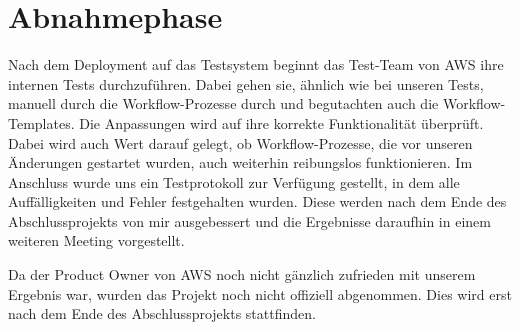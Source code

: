 \section{Abnahmephase}
\label{sec:Abnahmephase}

Nach dem Deployment auf das Testsystem beginnt das Test-Team von AWS ihre internen Tests durchzuführen.
Dabei gehen sie, ähnlich wie bei unseren Tests, manuell durch die Workflow-Prozesse durch und begutachten auch die Workflow-Templates.
Die Anpassungen wird auf ihre korrekte Funktionalität überprüft.
Dabei wird auch Wert darauf gelegt, ob Workflow-Prozesse, die vor unseren Änderungen gestartet wurden, auch weiterhin reibungslos funktionieren.
Im Anschluss wurde uns ein Testprotokoll zur Verfügung gestellt, in dem alle Auffälligkeiten und Fehler festgehalten wurden.
Diese werden nach dem Ende des Abschlussprojekts von mir ausgebessert und die Ergebnisse daraufhin in einem weiteren Meeting vorgestellt.

Da der Product Owner von AWS noch nicht gänzlich zufrieden mit unserem Ergebnis war, wurden das Projekt noch nicht offiziell abgenommen.
Dies wird erst nach dem Ende des Abschlussprojekts stattfinden.

